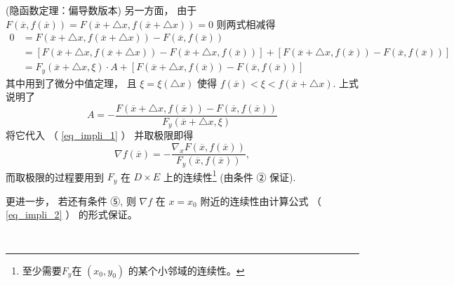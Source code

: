 \begin{theorem}{(隐函数定理：偏导数版本)}
另一方面， 由于 $F(\overline{x},f(\overline{x}))=F(\overline{x}+\triangle x,f(\overline{x}+\triangle x))=0$
则两式相减得
\begin{equation}
\begin{aligned}
0 & = F(\overline{x}+\triangle x,f(\overline{x}+\triangle x))-F(\overline{x},f(\overline{x}))\\
 & = \left[F(\overline{x}+\triangle x,f(\overline{x}+\triangle x))-F(\overline{x}+\triangle x,f(\overline{x}))\right]+\left[F(\overline{x}+\triangle x,f(\overline{x}))-F(\overline{x},f(\overline{x}))\right]\\
 & = F_{y}(\overline{x}+\triangle x,\xi)\cdot A+\left[F(\overline{x}+\triangle x,f(\overline{x}))-F(\overline{x},f(\overline{x}))\right]
\end{aligned}
\end{equation}
其中用到了微分中值定理， 且 $\xi=\xi(\triangle x)$ 使得 $f(\overline{x})<\xi<f(\overline{x}+\triangle x)$.
上式说明了 
\[
A=-{\displaystyle \frac{F(\overline{x}+\triangle x,f(\overline{x}))-F(\overline{x},f(\overline{x}))}{F_{y}(\overline{x}+\triangle x,\xi)}}
\]
将它代入 （ \autoref{eq_impli_1} ） 并取极限即得 
\begin{equation}\label{eq_impli_2}
\nabla f(\overline{x})=-{\displaystyle \frac{\nabla_{x}F(\overline{x},f(\overline{x}))}{F_{y}(\overline{x},f(\overline{x}))},}
\end{equation}
而取极限的过程要用到 $F_{y}$ 在 $D\times E$ 上的连续性\footnote{至少需要$F_y$在 $(x_0,y_0)$ 的某个小邻域的连续性。} (由条件 ② 保证). 

更进一步， 若还有条件 ⑤, 则 $\nabla f$ 在 $x=x_{0}$ 附近的连续性由计算公式 （ \autoref{eq_impli_2} ） 的形式保证。 
 \end{theorem}

\verb| |

